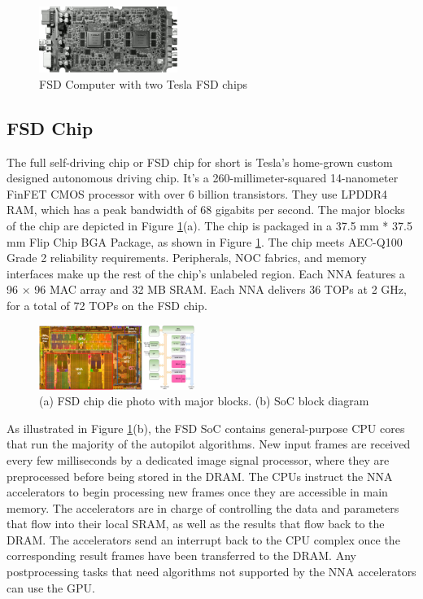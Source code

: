 \documentclass[letterpaper, 10 pt, conference]{ieeeconf}  %
\begin{document}
\begin{figure}[hbt!]
\centering
\includegraphics[width=0.4\textwidth]{gfx/900px-tesla_fsd_computer_board.png}
\caption{FSD Computer with two Tesla FSD chips}
\end{figure}


\subsection{FSD Chip}

The full self-driving chip or FSD chip for short is Tesla's home-grown custom designed autonomous driving chip. It's a 260-millimeter-squared 14-nanometer FinFET CMOS processor with over 6 billion transistors. They use LPDDR4 RAM, which has a peak bandwidth of 68 gigabits per second\cite{wikichip}. The major blocks of the chip are depicted in Figure \ref{fsd_soc}(a). The chip is packaged in a 37.5 mm * 37.5 mm Flip Chip BGA Package, as shown in Figure \ref{fsd_soc}. The chip meets AEC-Q100 Grade 2 reliability requirements. Peripherals, NOC fabrics, and memory interfaces make up the rest of the chip's unlabeled region. Each NNA features a 96 × 96 MAC array and 32 MB SRAM. Each NNA delivers 36 TOPs at 2 GHz, for a total of 72 TOPs on the FSD chip\cite{fsd_computer}.


\begin{figure}[hbt!]
\centering
\includegraphics[width=0.45\textwidth]{gfx/fsd_soc.png}
\caption{(a) FSD chip die photo with major blocks. (b) SoC block diagram}
\label{fsd_soc}
\end{figure}


As illustrated in Figure \ref{fsd_soc}(b), the FSD SoC contains general-purpose CPU cores that run the majority of the autopilot algorithms. New input frames are received every few milliseconds by a dedicated image signal processor, where they are preprocessed before being stored in the DRAM. The CPUs instruct the NNA accelerators to begin processing new frames once they are accessible in main memory. The accelerators are in charge of controlling the data and parameters that flow into their local SRAM, as well as the results that flow back to the DRAM. The accelerators send an interrupt back to the CPU complex once the corresponding result frames have been transferred to the DRAM. Any postprocessing tasks that need algorithms not supported by the NNA accelerators can use the GPU\cite{fsd_computer}.
\end{document}
